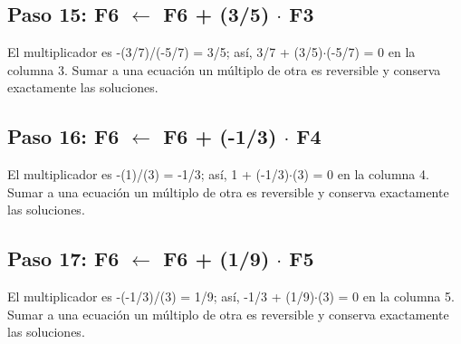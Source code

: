 \documentclass[conference]{IEEEtran}
\begin{document}
\medskip
\subsection*{Paso 15: F6 \(\leftarrow\) F6 + (3/5) \(\cdot\) F3}
El multiplicador es -(3/7)/(-5/7) = 3/5; así, 3/7 + (3/5)\(\cdot\)(-5/7) = 0 en la columna 3. Sumar a una ecuación un múltiplo de otra es reversible y conserva exactamente las soluciones.


\medskip
\subsection*{Paso 16: F6 \(\leftarrow\) F6 + (-1/3) \(\cdot\) F4}
El multiplicador es -(1)/(3) = -1/3; así, 1 + (-1/3)\(\cdot\)(3) = 0 en la columna 4. Sumar a una ecuación un múltiplo de otra es reversible y conserva exactamente las soluciones.


\medskip
\subsection*{Paso 17: F6 \(\leftarrow\) F6 + (1/9) \(\cdot\) F5}
El multiplicador es -(-1/3)/(3) = 1/9; así, -1/3 + (1/9)\(\cdot\)(3) = 0 en la columna 5. Sumar a una ecuación un múltiplo de otra es reversible y conserva exactamente las soluciones.
\end{document}
